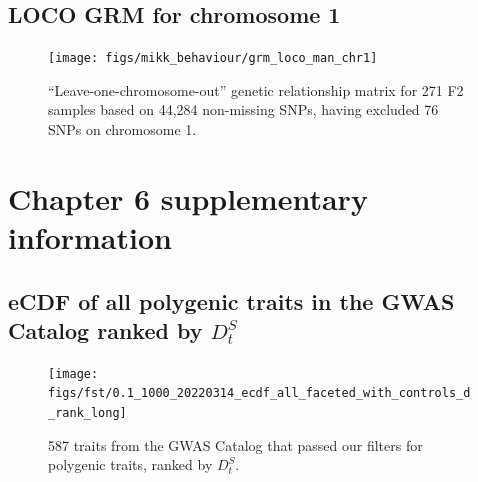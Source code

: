 \documentclass[
]{book}
\begin{document}
\hypertarget{loco-grm-for-chromosome-1}{%
\section{LOCO GRM for chromosome 1}\label{loco-grm-for-chromosome-1}}



\begin{figure}
\texttt{[image: figs/mikk\_behaviour/grm\_loco\_man\_chr1]} \caption{``Leave-one-chromosome-out'' genetic relationship matrix for 271 F2 samples based on 44,284 non-missing SNPs, having excluded 76 SNPs on chromosome 1.}\label{fig:loco-grm-chr1}
\end{figure}

\hypertarget{chapter-6-supplementary-information}{%
\chapter{Chapter 6 supplementary information}\label{chapter-6-supplementary-information}}

\hypertarget{ecdf-of-all-polygenic-traits-in-the-gwas-catalog-ranked-by-d_ts}{%
\section{\texorpdfstring{eCDF of all polygenic traits in the GWAS Catalog ranked by \({D_t^S}\)}{eCDF of all polygenic traits in the GWAS Catalog ranked by \{D\_t\^{}S\}}}\label{ecdf-of-all-polygenic-traits-in-the-gwas-catalog-ranked-by-d_ts}}



\begin{figure}
\texttt{[image: figs/fst/0.1\_1000\_20220314\_ecdf\_all\_faceted\_with\_controls\_d\_rank\_long]} \caption{587 traits from the GWAS Catalog that passed our filters for polygenic traits, ranked by \({D_t^S}\).}\label{fig:eCDFall}
\end{figure}
\end{document}
